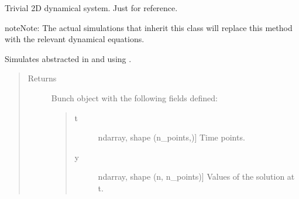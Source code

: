 \documentclass[a4paper,landscape,10pt,english]{sphinxmanual}
\begin{document}
\begin{fulllineitems}
\begin{fulllineitems}
\end{fulllineitems}


\begin{fulllineitems}
\label{\detokenize{code_docs/simulation_api.simulation:simulation_api.simulation.simulations.Simulation.dyn_sys_eqns}}
Trivial 2D dynamical system. Just for reference.

\begin{sphinxadmonition}{note}{Note:}
The actual simulations that inherit this class will replace this method
with the relevant dynamical equations.
\end{sphinxadmonition}

\end{fulllineitems}


\begin{fulllineitems}
\label{\detokenize{code_docs/simulation_api.simulation:simulation_api.simulation.simulations.Simulation.simulate}}
Simulates  abstracted in 
and using .
\begin{quote}\begin{description}
\item[{Returns}] \leavevmode

 \textendash{}

Bunch object with the following fields defined:
\begin{quote}
\begin{description}
\item[{t}] \leavevmode{[}ndarray, shape (n\_points,){]}
Time points.

\item[{y}] \leavevmode{[}ndarray, shape (n, n\_points){]}
Values of the solution at t.


\end{description}
\end{quote}
\end{description}
\end{quote}
\end{fulllineitems}
\end{fulllineitems}
\end{document}
